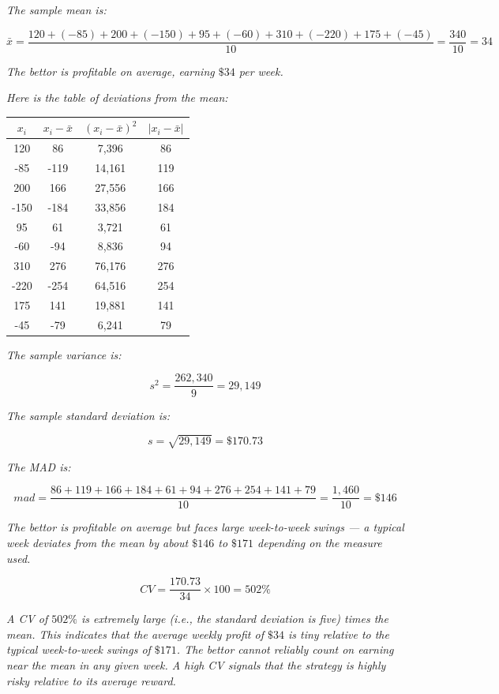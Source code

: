 \documentclass[
  11pt,
  letterpaper,
  DIV=11,
  numbers=noendperiod,
  oneside,
  open=any]{scrreprt}
\newenvironment{bsanswerkey}[2]{%
  \begin{tcolorbox}[bsbase, colback=bspaper2, colframe=bsline, fontupper=\small,
    title={\hypertarget{a-#1}{}\label{a-#1}\hyperlink{q-#1}{\textcolor{bsink2}{\MakeUppercase{#2}}}\hfill
      \hyperlink{q-#1}{\textcolor{bsaccent}{\normalfont\footnotesize back to page \pageref{q-#1}}}}]}%
  {\end{tcolorbox}}
\begin{document}
\begin{bsanswerkey}{bsans40}{Exercise 5, question 1}

\emph{The sample mean is:}

\[\bar{x} = \frac{120 + (-85) + 200 + (-150) + 95 + (-60) + 310 + (-220) + 175 + (-45)}{10} = \frac{340}{10} = 34\]

\emph{The bettor is profitable on average, earning \(\$34\) per week.}

\emph{Here is the table of deviations from the mean:}

\begin{center}
\begin{tabular}{cccc}
\toprule
\(x_{i}\) & \(x_{i}-\bar{x}\) & \((x_{i}-\bar{x})^2\) & \(|x_{i}-\bar{x}|\) \\
\midrule
120 & 86 & 7,396 & 86 \\
-85 & -119 & 14,161 & 119 \\
200 & 166 & 27,556 & 166 \\
-150 & -184 & 33,856 & 184 \\
95 & 61 & 3,721 & 61 \\
-60 & -94 & 8,836 & 94 \\
310 & 276 & 76,176 & 276 \\
-220 & -254 & 64,516 & 254 \\
175 & 141 & 19,881 & 141 \\
-45 & -79 & 6,241 & 79 \\
\bottomrule
\end{tabular}
\end{center}

\emph{The sample variance is:}

\[s^2 = \frac{262{,}340}{9} = 29{,}149\]

\emph{The sample standard deviation is:}

\[s = \sqrt{29{,}149} = \$170.73\]

\emph{The MAD is:}

\[mad = \frac{86+119+166+184+61+94+276+254+141+79}{10} = \frac{1{,}460}{10} = \$146\]

\emph{The bettor is profitable on average but faces large week-to-week
swings --- a typical week deviates from the mean by about \(\$146\) to
\(\$171\) depending on the measure used.}

\end{bsanswerkey}

\begin{bsanswerkey}{bsans41}{Exercise 5, question 2}

\[CV = \frac{170.73}{34} \times 100 = 502\%\]

\emph{A CV of \(502\%\) is extremely large (i.e., the standard deviation
is five) times the mean. This indicates that the average weekly profit
of \(\$34\) is tiny relative to the typical week-to-week swings of
\(\$171\). The bettor cannot reliably count on earning near the mean in
any given week. A high CV signals that the strategy is highly risky
relative to its average reward.}

\end{bsanswerkey}
\end{document}
